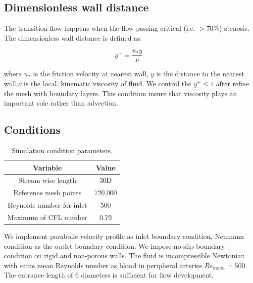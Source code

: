 \subsection{Dimensionless wall distance}

The transition flow happens when the flow passing critical (i.e. $ >70\% $) stenosis. The dimensionless wall distance is defined as:

\begin{equation}
y^{+} = \frac{u_{*} y}{\nu}
\end{equation}

where $u_*$ is the friction velocity at nearest wall, $y$ is the distance to the nearest wall,$\nu$ is the local. kinematic viscosity of fluid. 
We control the $y^+ \le 1$ after refine the mesh with boundary layers. This condition insure that viscosity plays an important role rather than advection.

\subsection{Conditions}

	\begin{table}[!h]
		\caption{ Simulation condition parameters.}
		\vspace{-5pt}
		\begin{center}
			\begin{tabular}{|c|c|}
				\hline
				\textbf{Variable} &\textbf{Value}\\
				\hline
				Stream wise length & 30D\\
				\hline
				Reference mesh points & 720,000\\
				\hline
				Reynolds number for inlet & 500\\
				\hline
				Maximum of CFL number & 0.79\\
				\hline
			\end{tabular}
		\end{center} 
	\end{table}

	We implement parabolic velocity profile as inlet boundary condition, Neumann condition as the outlet boundary condition.
	We impose no-slip boundary condition on rigid and non-porous walls.
	The fluid is incompressible Newtonian with same mean Reynolds number as blood in peripheral arteries ${Re}_{mean} = 500$.
	The entrance length of 6 diameters is sufficient for flow development.


